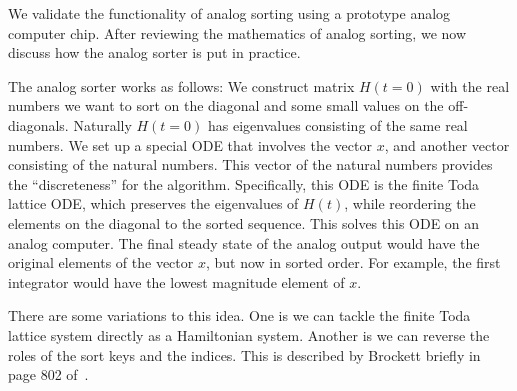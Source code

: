 We validate the functionality of analog sorting using a prototype analog computer chip.
After reviewing the mathematics of analog sorting, we now discuss how the analog sorter is put in practice.

The analog sorter works as follows:
We construct matrix $H(t=0)$ with the real numbers we want to sort on the diagonal and some small values on the off-diagonals.
Naturally $H(t=0)$ has eigenvalues consisting of the same real numbers.
We set up a special ODE that involves the vector $x$, and another vector consisting of the natural numbers.
This vector of the natural numbers provides the ``discreteness'' for the algorithm.
Specifically, this ODE is the finite Toda lattice ODE, which preserves the eigenvalues of $H(t)$, while reordering the elements on the diagonal to the sorted sequence.
This solves this ODE on an analog computer.
The final steady state of the analog output would have the original elements of the vector $x$, but now in sorted order.
For example, the first integrator would have the lowest magnitude element of $x$.



There are some variations to this idea.
One is we can tackle the finite Toda lattice system directly as a Hamiltonian system.
Another is we can reverse the roles of the sort keys and the indices.
This is described by Brockett briefly in page 802 of~\cite{brockett}.
